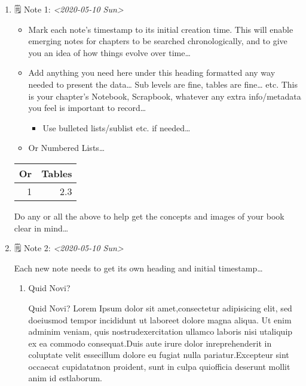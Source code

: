 \documentclass[11pt]{article}
\begin{document}
\begin{enumerate}
\item 🗒 Note 1: \textit{<2020-05-10 Sun>}
\label{sec:orgab5e6e1}

\begin{itemize}
\item Mark each note's timestamp to its initial creation time. This will enable emerging notes for chapters to be searched chronologically, and to give you an idea of how things evolve over time\ldots{}

\item Add anything you need here under this heading formatted any way needed to present the data\ldots{} Sub levels are fine, tables are fine\ldots{} etc.  This is your chapter's Notebook, Scrapbook, whatever any extra info/metadata you feel is important to record\ldots{}

\begin{itemize}
\item Use bulleted lists/sublist etc. if needed\ldots{}
\end{itemize}

\item Or Numbered Lists\ldots{}
\end{itemize}

\begin{center}
\begin{tabular}{rr}
\hline
Or & Tables\\
\hline
1 & 2.3\\
\hline
\end{tabular}
\end{center}

Do any or all the above to help get the concepts and images of your book clear in mind\ldots{}

\item 🗒 Note 2: \textit{<2020-05-10 Sun>}
\label{sec:org84e0ced}

Each new note needs to get its own heading and initial timestamp\ldots{}

\begin{enumerate}
\item Quid Novi?
\label{sec:org00c10a2}

Quid Novi? Lorem Ipsum dolor sit amet,consectetur adipisicing elit, sed doeiusmod tempor incididunt ut laboreet dolore magna aliqua. Ut enim adminim veniam, quis nostrudexercitation ullamco laboris nisi utaliquip ex ea commodo consequat.Duis aute irure dolor inreprehenderit in coluptate velit essecillum dolore eu fugiat nulla pariatur.Excepteur sint occaecat cupidatatnon proident, sunt in culpa quiofficia deserunt mollit anim id estlaborum.
\end{enumerate}


\end{enumerate}
\end{document}

